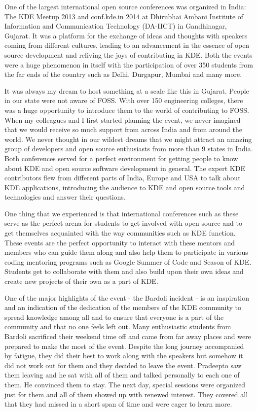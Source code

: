 
\noindent{}One of the largest international open source conferences was organized in India: The KDE Meetup 2013 and conf.kde.in 2014 at Dhirubhai Ambani Institute of Information and Communication Technology (DA-IICT) in Gandhinagar, Gujarat. It was a platform for the exchange of ideas and thoughts with speakers coming from different cultures, leading to an advancement in the essence of open source development and reliving the joys of contributing in KDE. Both the events were a huge phenomenon in itself with the participation of over 350 students from the far ends of the country such as Delhi, Durgapur, Mumbai and many more. 

It was always my dream to host something at a scale like this in Gujarat. People in our state were not aware of FOSS. With over 150 engineering colleges, there was a huge opportunity to introduce them to the world of contributing to FOSS. When my colleagues and I first started planning the event, we never imagined that we would receive so much support from across India and from around the world. We never thought in our wildest dreams that we might attract an amazing group of developers and open source enthusiasts from more than 9 states in India. Both conferences served for a perfect environment for getting people to know about KDE and open source software development in general. The expert KDE contributors flew from different parts of India, Europe and USA to talk about KDE applications, introducing the audience to KDE and open source tools and technologies and answer their questions. 

One thing that we experienced is that international conferences such as these serve as the perfect arena for students to get involved with open source and to get themselves acquainted with the way communities such as KDE function. These events are the perfect opportunity to interact with these mentors and members who can guide them along and also help them to participate in various coding mentoring programs such as Google Summer of Code and Season of KDE. Students get to collaborate with them and also build upon their own ideas and create new projects of their own as a part of KDE.

One of the major highlights of the event - the Bardoli incident - is an inspiration and an indication of the dedication of the members of the KDE community to spread knowledge among all and to ensure that everyone is a part of  the community and that no one feels left out. Many enthusiastic students from Bardoli sacrificed their weekend time off and came from far away places and were prepared to make the most of the event. Despite the long journey accompanied by fatigue, they did their best to work along with the speakers but somehow it did not work out for them and they decided to leave the event. Pradeepto saw them leaving and he sat with all of them and talked personally to each one of them. He convinced them to stay. The next day, special sessions were organized just for them and all of them showed up with renewed interest. They covered all that they had missed in a short span of time and were eager to learn more.

